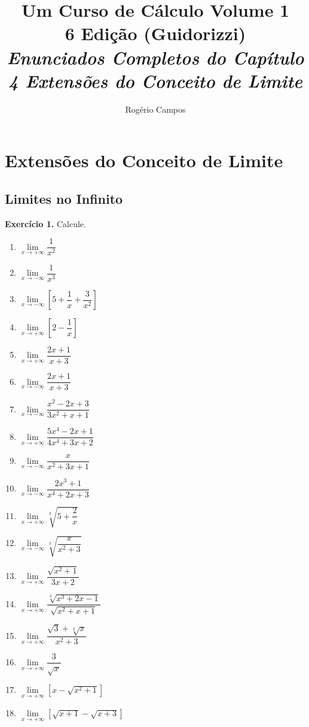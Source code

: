 \documentclass[12pt,a4paper]{article}
\title{
    \Huge \textbf{Um Curso de Cálculo Volume 1} \\
    \vspace{0.3cm}
    \Large 6\textordfeminine{} Edição (Guidorizzi) \\
    \vspace{0.5cm}
    \large \textit{Enunciados Completos do Capítulo 4 Extensões do Conceito de Limite}
}
\author{Rogério Campos}
\begin{document}
\maketitle
\newpage

\tableofcontents
\newpage

\setcounter{section}{3}
\setcounter{subsection}{0}

\section{Extensões do Conceito de Limite}
\subsection{Limites no Infinito}
\vspace{0.5cm}
\noindent\textbf{Exercício 1.} Calcule.
\begin{enumerate}
    \renewcommand{\theenumi}{\alph{enumi}}
    \renewcommand{\labelenumi}{\theenumi)}
    \item $\lim\limits_{x \to +\infty} \dfrac{1}{x^2}$
    \item $\lim\limits_{x \to -\infty} \dfrac{1}{x^3}$
    \item $\lim\limits_{x \to -\infty} \left[5 + \dfrac{1}{x} + \dfrac{3}{x^2}\right]$
    \item $\lim\limits_{x \to +\infty} \left[2 - \dfrac{1}{x}\right]$
    \item $\lim\limits_{x \to +\infty} \dfrac{2x + 1}{x + 3}$
    \item $\lim\limits_{x \to -\infty} \dfrac{2x + 1}{x + 3}$
    \item $\lim\limits_{x \to -\infty} \dfrac{x^2 - 2x + 3}{3x^2 + x + 1}$
    \item $\lim\limits_{x \to +\infty} \dfrac{5x^4 - 2x + 1}{4x^4 + 3x + 2}$
    \item $\lim\limits_{x \to -\infty} \dfrac{x}{x^2 + 3x + 1}$
    \item $\lim\limits_{x \to -\infty} \dfrac{2x^3 + 1}{x^4 + 2x + 3}$
    \item $\lim\limits_{x \to +\infty} \sqrt[3]{5 + \dfrac{2}{x}}$
    \item $\lim\limits_{x \to -\infty} \sqrt[3]{\dfrac{x}{x^2 + 3}}$
    \item $\lim\limits_{x \to +\infty} \dfrac{\sqrt{x^2 + 1}}{3x + 2}$
    \item $\lim\limits_{x \to +\infty} \dfrac{\sqrt[3]{x^3 + 2x - 1}}{\sqrt{x^2 + x + 1}}$
    \item $\lim\limits_{x \to +\infty} \dfrac{\sqrt{3} + \sqrt[3]{x}}{x^2 + 3}$
    \item $\lim\limits_{x \to +\infty} \dfrac{3}{\sqrt{x}}$
    \item $\lim\limits_{x \to +\infty} \left[x - \sqrt{x^2 + 1}\right]$
    \item $\lim\limits_{x \to +\infty} \left[\sqrt{x + 1} - \sqrt{x + 3}\right]$
\end{enumerate}
\end{document}
